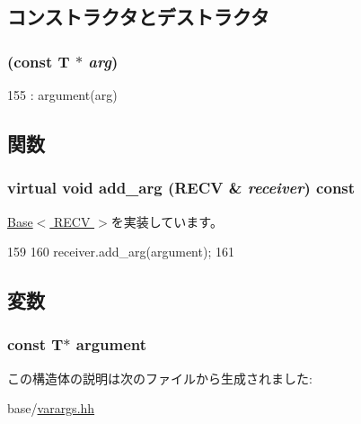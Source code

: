 \subsection{コンストラクタとデストラクタ}
\hypertarget{structVarArgs_1_1Any_3_01T_01_5_00_01RECV_01_4_a091fcc02dc3b751d9aa12b299a74802d}{
\subsubsection[{Any}]{ (const T $\ast$ {\em arg})}}
\label{structVarArgs_1_1Any_3_01T_01_5_00_01RECV_01_4_a091fcc02dc3b751d9aa12b299a74802d}



\begin{DoxyCode}
155 : argument(arg) {}
\end{DoxyCode}


\subsection{関数}
\hypertarget{structVarArgs_1_1Any_3_01T_01_5_00_01RECV_01_4_ab9c3a36cee779f61ec3d8d4d3db17f87}{
\subsubsection[{add\_\-arg}]{\setlength{\rightskip}{0pt plus 5cm}virtual void add\_\-arg (RECV \& {\em receiver}) const}}
\label{structVarArgs_1_1Any_3_01T_01_5_00_01RECV_01_4_ab9c3a36cee779f61ec3d8d4d3db17f87}


\hyperlink{structVarArgs_1_1Base_ab6d5cea89e524f1ebe6ae84147552b0c}{Base$<$ RECV $>$}を実装しています。


\begin{DoxyCode}
159     {
160         receiver.add_arg(argument);
161     }
\end{DoxyCode}


\subsection{変数}
\hypertarget{structVarArgs_1_1Any_3_01T_01_5_00_01RECV_01_4_ac498d12221934e767f11d95a9a0ca7a9}{
\subsubsection[{argument}]{\setlength{\rightskip}{0pt plus 5cm}const T$\ast$ {\bf argument}}}
\label{structVarArgs_1_1Any_3_01T_01_5_00_01RECV_01_4_ac498d12221934e767f11d95a9a0ca7a9}


この構造体の説明は次のファイルから生成されました:\begin{DoxyCompactItemize}
\item 
base/\hyperlink{varargs_8hh}{varargs.hh}\end{DoxyCompactItemize}
